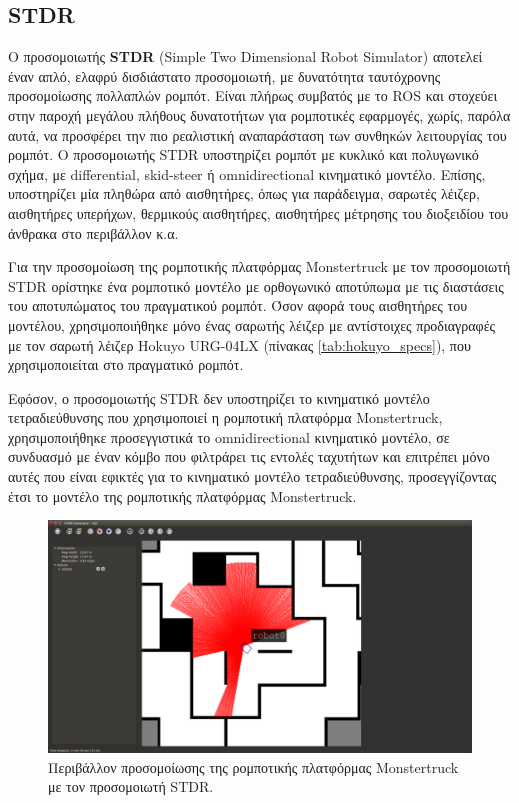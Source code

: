 \subsection{STDR} \label{ssec:stdr}
Ο προσομοιωτής \textbf{STDR} (Simple Two Dimensional Robot Simulator) αποτελεί έναν απλό, ελαφρύ δισδιάστατο προσομοιωτή, με δυνατότητα ταυτόχρονης προσομοίωσης πολλαπλών ρομπότ. Είναι πλήρως συμβατός με το ROS και στοχεύει στην παροχή μεγάλου πλήθους δυνατοτήτων για ρομποτικές εφαρμογές, χωρίς, παρόλα αυτά, να προσφέρει την πιο ρεαλιστική αναπαράσταση των συνθηκών λειτουργίας του ρομπότ. Ο προσομοιωτής STDR υποστηρίζει ρομπότ με κυκλικό και πολυγωνικό σχήμα, με differential, skid-steer ή omnidirectional κινηματικό μοντέλο. Επίσης, υποστηρίζει μία πληθώρα από αισθητήρες, όπως για παράδειγμα, σαρωτές λέιζερ, αισθητήρες υπερήχων, θερμικούς αισθητήρες, αισθητήρες μέτρησης του διοξειδίου του άνθρακα στο περιβάλλον κ.α. 

\bigskip
Για την προσομοίωση της ρομποτικής πλατφόρμας Monstertruck με τον προσομοιωτή STDR ορίστηκε ένα ρομποτικό μοντέλο με ορθογωνικό αποτύπωμα με τις διαστάσεις του αποτυπώματος του πραγματικού ρομπότ. Όσον αφορά τους αισθητήρες του μοντέλου, χρησιμοποιήθηκε μόνο ένας σαρωτής λέιζερ με αντίστοιχες προδιαγραφές με τον σαρωτή λέιζερ Hokuyo URG-04LX  (πίνακας \ref{tab:hokuyo_specs}), που χρησιμοποιείται στο πραγματικό ρομπότ.

\bigskip
Εφόσον, ο προσομοιωτής STDR δεν υποστηρίζει το κινηματικό μοντέλο τετραδιεύθυνσης που χρησιμοποιεί η ρομποτική πλατφόρμα Monstertruck, χρησιμοποιήθηκε προσεγγιστικά το omnidirectional κινηματικό μοντέλο, σε συνδυασμό με έναν κόμβο που φιλτράρει τις εντολές ταχυτήτων και επιτρέπει μόνο αυτές που είναι εφικτές για το κινηματικό μοντέλο τετραδιεύθυνσης, προσεγγίζοντας έτσι το μοντέλο της ρομποτικής πλατφόρμας Monstertruck.

\begin{figure}[!ht]
	\centering
	\includegraphics[width=\linewidth]{Chapters/Chapter4/Figures/stdr_simulator.png}
	\caption{Περιβάλλον προσομοίωσης της ρομποτικής πλατφόρμας Monstertruck με τον προσομοιωτή STDR.}
	\label{fig:stdr_simulator}
\end{figure}

